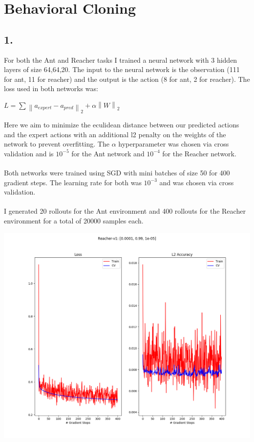 \documentclass[12pt]{report}
\newcommand{\norm}[1]{\left\lVert #1 \right\rVert}
\begin{document}
\section*{Behavioral Cloning}
\subsection*{1.}
For both the Ant and Reacher tasks I trained a neural network with 3 hidden layers of size 64,64,20. The input to the neural network is the observation (111 for ant, 11 for reacher) and the output is the action (8 for ant, 2 for reacher). The loss used in both networks was:
\begin{center}
$L=\sum \norm{a_{expert}-a_{pred}}_2 + \alpha \norm{W}_2$
\end{center}
Here we aim to minimize the eculidean distance between our predicted actions and the expert actions with an additional l2 penalty on the weights of the network to prevent overfitting. The $\alpha$ hyperparameter was chosen via cross validation and is $10^{-5}$ for the Ant network and $10^{-4}$ for the Reacher network.\\ \\
Both networks were trained using SGD with mini batches of size 50 for 400 gradient steps. The learning rate for both was $10^{-3}$ and was chosen via cross validation.\\
\\
I generated 20 rollouts for the Ant environment and 400 rollouts for the Reacher environment for a total of 20000 samples each.\\
\newpage
\begin{center}
\includegraphics[scale=.6]{./images/reacher_train_summary.png}
\end{center}
\end{document}
